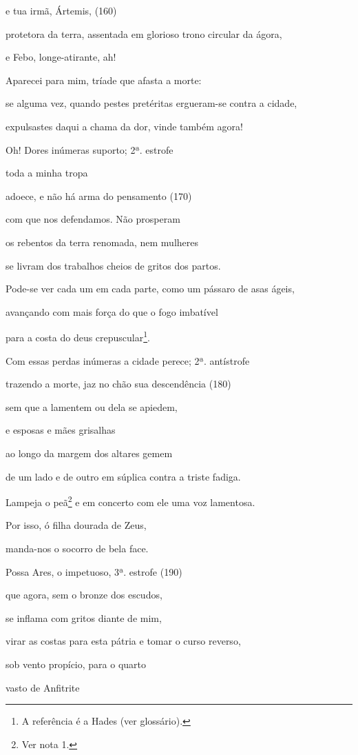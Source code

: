 e tua irmã, Ártemis, (160)

protetora da terra, assentada em glorioso trono circular da ágora,

e Febo, longe-atirante, ah!

Aparecei para mim, tríade que afasta a morte:

se alguma vez, quando pestes pretéritas ergueram-se contra a cidade,

expulsastes daqui a chama da dor, vinde também agora!

Oh! Dores inúmeras suporto; 2ª. estrofe

toda a minha tropa

adoece, e não há arma do pensamento (170)

com que nos defendamos. Não prosperam

os rebentos da terra renomada, nem mulheres

se livram dos trabalhos cheios de gritos dos partos.

Pode-se ver cada um em cada parte, como um pássaro de asas ágeis,

avançando com mais força do que o fogo imbatível

para a costa do deus crepuscular\footnote{A referência é a Hades (ver
  glossário).}.

Com essas perdas inúmeras a cidade perece; 2ª. antístrofe

trazendo a morte, jaz no chão sua descendência (180)

sem que a lamentem ou dela se apiedem,

e esposas e mães grisalhas

ao longo da margem dos altares gemem

de um lado e de outro em súplica contra a triste fadiga.

Lampeja o peã\footnote{Ver nota 1.} e em concerto com ele uma voz
lamentosa.

Por isso, ó filha dourada de Zeus,

manda-nos o socorro de bela face.

Possa Ares, o impetuoso, 3ª. estrofe (190)

que agora, sem o bronze dos escudos,

se inflama com gritos diante de mim,

virar as costas para esta pátria e tomar o curso reverso,

sob vento propício, para o quarto

vasto de Anfitrite

